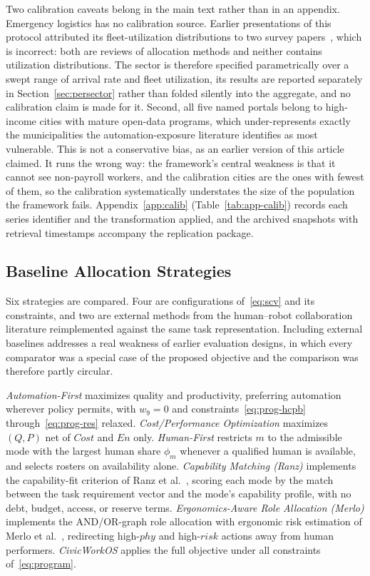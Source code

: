 	Two calibration caveats belong in the main text rather than in an appendix. Emergency logistics has no calibration source. Earlier presentations of this protocol attributed its fleet-utilization distributions to two survey papers~\cite{MeseguerValenzuela2025,Hady2025}, which is incorrect: both are reviews of allocation methods and neither contains utilization distributions. The sector is therefore specified parametrically over a swept range of arrival rate and fleet utilization, its results are reported separately in Section~\ref{sec:persector} rather than folded silently into the aggregate, and no calibration claim is made for it. Second, all five named portals belong to high-income cities with mature open-data programs, which under-represents exactly the municipalities the automation-exposure literature identifies as most vulnerable. This is not a conservative bias, as an earlier version of this article claimed. It runs the wrong way: the framework's central weakness is that it cannot see non-payroll workers, and the calibration cities are the ones with fewest of them, so the calibration systematically understates the size of the population the framework fails. Appendix~\ref{app:calib} (Table~\ref{tab:app-calib}) records each series identifier and the transformation applied, and the archived snapshots with retrieval timestamps accompany the replication package.
	
	\subsection{Baseline Allocation Strategies}
	\label{sec:baselines}
	
	Six strategies are compared. Four are configurations of~\eqref{eq:scv} and its constraints, and two are external methods from the human--robot collaboration literature reimplemented against the same task representation. Including external baselines addresses a real weakness of earlier evaluation designs, in which every comparator was a special case of the proposed objective and the comparison was therefore partly circular.
	
	\textit{Automation-First} maximizes quality and productivity, preferring automation wherever policy permits, with $w_9 = 0$ and constraints~\eqref{eq:prog-hcpb} through~\eqref{eq:prog-res} relaxed. \textit{Cost/Performance Optimization} maximizes $(Q,P)$ net of $Cost$ and $En$ only. \textit{Human-First} restricts $m$ to the admissible mode with the largest human share $\phi_m$ whenever a qualified human is available, and selects rosters on availability alone. \textit{Capability Matching (Ranz)} implements the capability-fit criterion of Ranz et al.~\cite{Ranz2017}, scoring each mode by the match between the task requirement vector and the mode's capability profile, with no debt, budget, access, or reserve terms. \textit{Ergonomics-Aware Role Allocation (Merlo)} implements the AND/OR-graph role allocation with ergonomic risk estimation of Merlo et al.~\cite{Merlo2023}, redirecting high-$phy$ and high-$risk$ actions away from human performers. \textit{CivicWorkOS} applies the full objective under all constraints of~\eqref{eq:program}.
	
